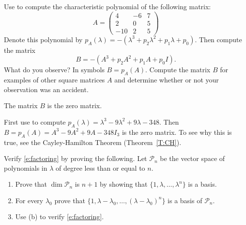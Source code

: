 \documentclass{ximera}
\begin{document}
\begin{exercise} \label{c10.2.10}
Use \Matlab to compute the characteristic polynomial of the following
matrix:
\[
A = \left( \begin{array}{rrr}
 4 & -6 & 7\\
 2 & 0 & 5\\
-10 & 2 & 5
\end{array} \right)
\]
Denote this polynomial by $p_A(\lambda) = 
-(\lambda^3 + p_2 \lambda^2 + p_1 \lambda + p_0)$.  Then compute
the matrix
\[
B = -(A^3 + p_2 A^2 + p_1 A + p_0 I).
\]
What do you observe?  In symbols $B=p_A(A)$.  Compute the matrix $B$ for
examples of other square matrices $A$ and determine whether or not 
your observation was an accident.

\begin{solution}

\ans The matrix $B$ is the zero matrix.

\soln First use \Matlab to compute
$p_A(\lambda) = \lambda^3 - 9\lambda^2 + 9\lambda - 348$.  Then
$B = p_A(A) = A^3 - 9A^2 + 9A - 348I_3$ is the zero matrix.  To
see why this is true, see the Cayley-Hamilton Theorem
(Theorem~\ref{T:CH}).



\end{solution}
\end{exercise}

\AEXER

\begin{exercise} \label{c8.2.a1}
Verify \eqref{e:factoring} by proving the following.  Let $\mathcal{P}_n$ be the vector space 
of polynomials in $\lambda$ of degree less than or equal to $n$.
\begin{enumerate}
\item Prove that $\dim\mathcal{P}_n$ is $n+1$ by showing that $\{1,\lambda,\ldots,\lambda^n\}$ 
is a basis.
\item For every $\lambda_0$ prove that $\{1, \lambda-\lambda_0, \ldots,(\lambda-\lambda_0)^n\}$ 
is a basis of $\mathcal{P}_n$.
\item Use {\rm (b)} to verify \eqref{e:factoring}.
\end{enumerate}
\end{exercise}
\end{document}
